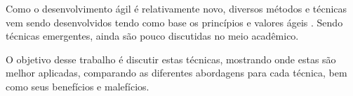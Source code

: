 Como o desenvolvimento ágil é relativamente novo, diversos métodos e técnicas
vem sendo desenvolvidos tendo como base os princípios e valores ágeis
\cite{BDDRodrigo}. Sendo técnicas emergentes, ainda são pouco discutidas no meio
acadêmico.

O objetivo desse trabalho é discutir estas técnicas, mostrando onde estas são
melhor aplicadas, comparando as diferentes abordagens para cada técnica, bem
como seus benefícios e malefícios.

